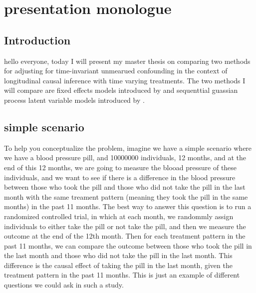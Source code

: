\chapter{presentation monologue}

\section{Introduction}
hello everyone, today I will present my master thesis on comparing 
two methods for adjusting for time-invariant unmearued confounding in the context of 
longitudinal causal inference with time varying treatments. The two methods I will compare are fixed effects models 
introduced by \cite{blackwellEffectPoliticalAdvertising2024} and sequenttial guassian process latent variable models introduced by \cite{hattSequentialDeconfoundingCausal2024}.

\section{simple scenario}
To help you conceptualize the problem, imagine we have a simple scenario where we have a blood pressure pill, and
 10000000 individuals, 12 months, and at the end of this 12 months, we are going to measure the blooad pressure of these individuals, 
and we want to see if there is a difference in the blood pressure between those who took the pill and those who did not take the pill in the 
last month with the same treament pattern (meaning they took the pill in the same months) in the past 11 months. 
The best way to answer this question is to run a randomized 
controlled trial, in which at each month, we randommly assign individuals to either take the pill or not take the pill, 
and then we measure the outcome at the end of the 12th month. Then for each treatment pattern in the past 11 months, 
we can compare the outcome between those who took the pill in the last month and those who did not take the pill in the last month. This 
difference is the causal effect of taking the pill in the last month, given the treatment pattern in the past 11 months. This is just an example of 
different questions we could ask in such a study.  


